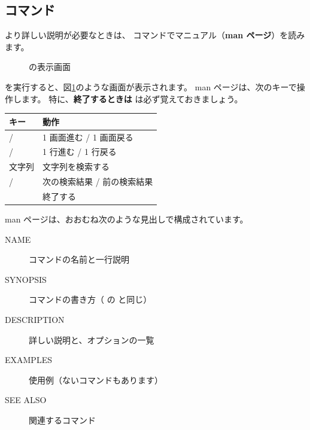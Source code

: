 \begin{terminal}[コマンドの基本形]
\subsection{ コマンド}

より詳しい説明が必要なときは、 コマンドでマニュアル（\textbf{man ページ}）を読みます。


\begin{figure}[tb]
  \centering
  \large
  \caption{ の表示画面}
  \label{fig:terminal-man}
\end{figure}

 を実行すると、図\ref{fig:terminal-man}のような画面が表示されます。
man ページは、次のキーで操作します。
特に、\textbf{終了するときは } は必ず覚えておきましょう。

\begin{center}
  \begin{tabular}{ll}
    \toprule
    キー & 動作 \\
    \midrule
    \key{Space} / \key{b} & 1 画面進む / 1 画面戻る \\
    \key{\(\downarrow\)} / \key{\(\uparrow\)} & 1 行進む / 1 行戻る \\
    \key{/} 文字列 & 文字列を検索する \\
    \key{n} / \key{N} & 次の検索結果 / 前の検索結果 \\
    \key{q} & 終了する \\
    \bottomrule
  \end{tabular}
\end{center}

man ページは、おおむね次のような見出しで構成されています。

\begin{description}
  \item[NAME] コマンドの名前と一行説明
  \item[SYNOPSIS] コマンドの書き方（ の  と同じ）
  \item[DESCRIPTION] 詳しい説明と、オプションの一覧
  \item[EXAMPLES] 使用例（ないコマンドもあります）
  \item[SEE ALSO] 関連するコマンド
\end{description}


\end{terminal}
